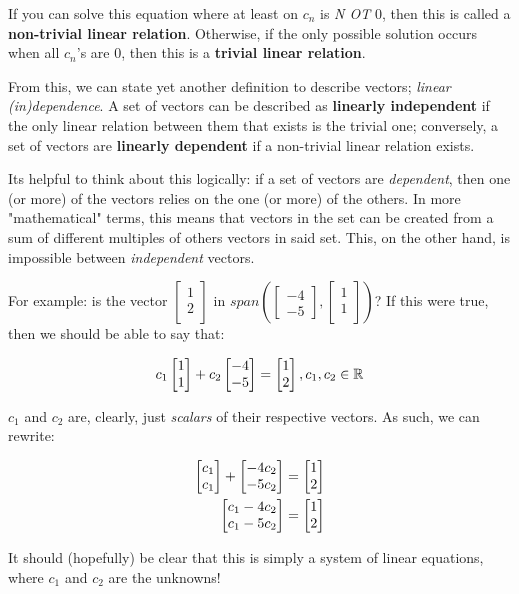 \documentclass[12pt]{article}
\begin{document}
If you can solve this equation where at least on $c_n$ is \textit{N
OT} 0, then this is called a \textbf{non-trivial linear relation}. Otherwise, if the only possible solution occurs when all $c_n$'s are 0, then this is a \textbf{trivial linear relation}.

From this, we can state yet another definition to describe vectors; \textit{linear (in)dependence}. A set of vectors can be described as \textbf{linearly independent} if the only linear relation between them that exists is the trivial one; conversely, a set of vectors are \textbf{linearly dependent} if a non-trivial linear relation exists.

Its helpful to think about this logically: if a set of vectors are \textit{dependent}, then one (or more) of the vectors relies on the one (or more) of the others. In more "mathematical" terms, this means that vectors in the set can be created from a sum of different multiples of others vectors in said set. This, on the other hand, is impossible between \textit{independent} vectors.

For example: is the vector $\begin{bmatrix}
1\\
2\\
\end{bmatrix}$ in $span(\begin{bmatrix}
-4\\
-5
\end{bmatrix}, \begin{bmatrix}
1\\
1\\
\end{bmatrix})$? If this were true, then we should be able to say that:

$$c_1 \begin{bmatrix} 1\\ 1\\ \end{bmatrix} + c_2 \begin{bmatrix} -4\\ -5\\ \end{bmatrix} = \begin{bmatrix} 1\\ 2\\ \end{bmatrix}, c_1, c_2 \in \mathbb{R}$$

$c_1$ and $c_2$ are, clearly, just \textit{scalars} of their respective vectors. As such, we can rewrite:

\begin{equation}
    \begin{split}
        \begin{bmatrix} c_1\\ c_1\\ \end{bmatrix} + \begin{bmatrix} -4 c_2\\ -5 c_2\\ \end{bmatrix} &= \begin{bmatrix} 1\\ 2\\ \end{bmatrix}\\
        \begin{bmatrix} c_1 - 4 c_2\\ c_1 - 5 c_2\\ \end{bmatrix} &= \begin{bmatrix} 1\\ 2\\ \end{bmatrix}
    \end{split}
\end{equation}

It should (hopefully) be clear that this is simply a system of linear equations, where $c_1$ and $c_2$ are the unknowns!
\end{document}
